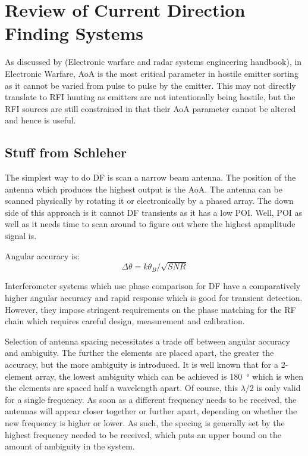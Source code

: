 \chapter{Review of Current Direction Finding Systems}

As discussed by (Electronic warfare and radar systems engineering handbook), in Electronic Warfare, AoA is the most critical parameter in hostile emitter sorting as it cannot be varied from pulse to pulse by the emitter. This may not directly translate to RFI hunting as emitters are not intentionally being hostile, but the RFI sources are still constrained in that their AoA parameter cannot be altered and hence is useful. 

\section{Stuff from Schleher}
The simplest way to do DF is scan a narrow beam antenna. The position of the antenna which produces the highest output is the AoA. The antenna can be scanned physically by rotating it or electronically by a phased array. 
The down side of this approach is it cannot DF transients as it has a low POI. Well, POI as well as it needs time to scan around to figure out where the highest apmplitude signal is.

Angular accuracy is:
\begin{equation}
  \Delta \theta = k \theta_B / \sqrt{SNR}
\end{equation}

Interferometer systems which use phase comparison for DF have a comparatively higher angular accuracy and rapid response which is good for transient detection. However, they impose stringent requirements on the phase matching for the RF chain which requires careful design, measurement and calibration. 

Selection of antenna spacing necessitates a trade off between angular accuracy and ambiguity. The further the elements are placed apart, the greater the accuracy, but the more ambiguity is introduced. It is well known that for a 2-element array, the lowest ambiguity which can be achieved is \SI{180}{\degree} which is when the elements are spaced half a wavelength apart. 
Of course, this \(\lambda/2\) is only valid for a single frequency. As soon as a different frequency needs to be received, the antennas will appear closer together or further apart, depending on whether the new frequency is higher or lower. As such, the specing is generally set by the highest frequency needed to be received, which puts an upper bound on the amount of ambiguity in the system. 

